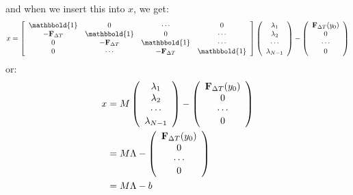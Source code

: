 and when we insert this into $x$, we get:
\begin{align}
x = \left[ \begin{array}{cccc}
   \mathbbold{1} & 0 & \cdots & 0 \\  
   -\bold{F}_{\Delta T} & \mathbbold{1} & 0 & \cdots \\ 
   0 &-\bold{F}_{\Delta T} & \mathbbold{1}  & \cdots \\
   0 &\cdots &-\bold{F}_{\Delta T} &  \mathbbold{1}  \\
   \end{array}  \right]
   \left( \begin{array}{c}
   \lambda_1 \\  
   \lambda_2 \\ 
   \cdots  \\
   \lambda_{N-1}  \\
   \end{array}  \right) -
   \left( \begin{array}{c}
   \bold{F}_{\Delta T}(y_0)\\  
   0\\ 
   \cdots  \\
   0  \\
   \end{array}  \right)
\end{align}
or:
\begin{align}
x  &= M \left( \begin{array}{c}
   \lambda_1 \\  
   \lambda_2 \\ 
   \cdots  \\
   \lambda_{N-1}  \\
   \end{array}  \right) -
   \left( \begin{array}{c}
   \bold{F}_{\Delta T}(y_0)\\  
   0\\ 
   \cdots  \\
   0  \\
   \end{array}  \right) \\
   & = M \Lambda -\left( \begin{array}{c}
   \bold{F}_{\Delta T}(y_0)\\  
   0\\ 
   \cdots  \\
   0  \\
   \end{array}  \right) \\
   &=M \Lambda-b
\end{align}
